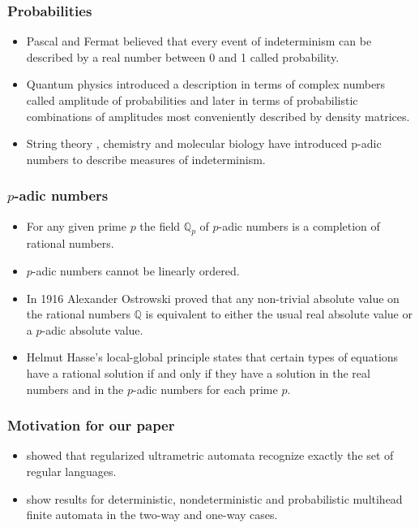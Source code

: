 \documentclass{beamer}
\begin{document}
\begin{frame}
\frametitle{Probabilities}
\begin{itemize}
\item Pascal and Fermat believed that every event of indeterminism can be described by a real number between 0 and 1 called probability.
\item Quantum physics introduced a description in terms of complex numbers called amplitude of probabilities and later in terms of probabilistic combinations of amplitudes most conveniently described by density matrices.
\item String theory \cite{V.S.Vladimirov1995}, chemistry \cite{Kozyrev2006} and molecular biology \cite{Dragovich2009} have introduced p-adic numbers to describe measures of indeterminism.
\end{itemize}
\end{frame}

\begin{frame}
\frametitle{$p$-adic numbers}
\begin{itemize}
	\item For any given prime $p$ the field $\mathbb{Q}_p$ of $p$-adic numbers is a completion of rational numbers.
	\item $p$-adic numbers cannot be linearly ordered.
	\item In 1916 Alexander Ostrowski 
proved that any non-trivial absolute value on the rational numbers $\mathbb{Q}$ is equivalent to either the usual real absolute value or a $p$-adic absolute value.
	\item Helmut Hasse's local-global principle
 states that certain types of equations have a rational solution if and only if they have a solution in the real numbers and in the $p$-adic numbers for each prime $p$.
\end{itemize}
\end{frame}

\begin{frame}
\frametitle{Motivation for our paper}
\begin{itemize}
	\item \citep{KasparsBalodis2013} showed that regularized ultrametric automata recognize exactly the set of regular languages.
	\item \citep{Holzer2009, Yao1978, Monien1980, Macarie1995} show results for deterministic, nondeterministic and probabilistic multihead finite automata in the two-way and one-way cases.
\end{itemize}
\end{frame}
\end{document}
